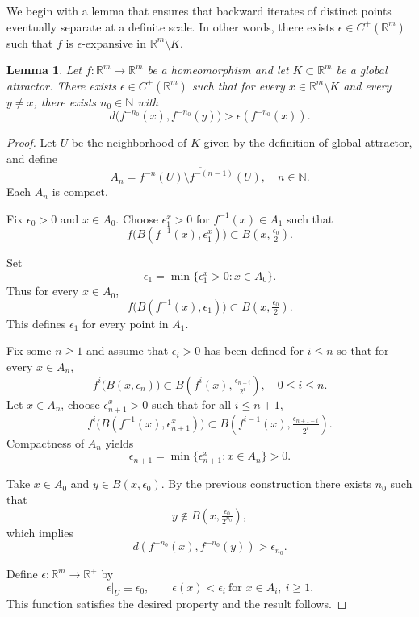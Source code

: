 \documentclass{amsart}
\newtheorem{lemma}{Lemma}
\newcommand{\R}{{\mathbb{R}}}
\newcommand{\N}{{\mathbb{N}}}
\begin{document}
	
	We begin with a lemma that ensures that backward iterates of distinct points eventually separate at a definite scale. In other words, there exists $\epsilon\in C^+(\R^m)$ such that $f$ is $\epsilon$-expansive in $\R^m\setminus K$.
	
	\begin{lemma}\label{epsilon_expansivo_gral}
		Let $f:\R^m\to \R^m$ be a homeomorphism and let $K\subset \R^m$ be a global attractor.  
		There exists $\epsilon\in C^+(\R^m)$ such that for every $x\in \R^m\setminus K$ and every $y\neq x$, there exists $n_0\in \N$ with  
		\[
		d\big(f^{-n_0}(x), f^{-n_0}(y)\big)>\epsilon(f^{-n_0}(x)).
		\]
	\end{lemma}
	
	\begin{proof}
		Let $U$ be the neighborhood of $K$ given by the definition of global attractor, and define  
		\[
		A_n=\overline{f^{-n}(U)\setminus f^{-(n-1)}(U)},\quad n\in\N.
		\]
		Each $A_n$ is compact.
		
		
		  
		Fix $\epsilon_0>0$ and   $x\in A_0$.  
		Choose $\epsilon_1^x>0$ for $f^{-1}(x)\in A_1$ such that  
		\[
		f\big(B(f^{-1}(x), \epsilon_1^x)\big)\subset B(x,\tfrac{\epsilon_0}{2}).
		\] 
		
		Set  
		\[
		\epsilon_1=\min\{\epsilon_1^{x}>0: x\in A_0\}.
		\]  
		Thus for every $x\in A_0$,  
		\[
		f\big(B(f^{-1}(x), \epsilon_1)\big)\subset B(x,\tfrac{\epsilon_0}{2}).
		\]  
		This defines $\epsilon_1$ for every point in $A_1$.		
		
		
		
		
		
		
		
		
		
		
		
	 
		Fix some $n\geq 1$ and assume that $\epsilon_i>0$ has been defined for $i\leq n$ so that for every $x\in A_n$,  
		\[
		f^i\big(B(x,\epsilon_n)\big)\subset B\!\left(f^i(x), \tfrac{\epsilon_{n-i}}{2^i}\right),\quad 0\leq i\leq n.
		\]  
		Let $x\in A_n$,  
		choose $\epsilon_{n+1}^x>0$ such that for all $i\leq n+1$,  
		\[
		f^i\big(B(f^{-1}(x),\epsilon_{n+1}^x)\big)\subset B\!\left(f^{i-1}(x), \tfrac{\epsilon_{n+1-i}}{2^i}\right).
		\]  
		Compactness of $A_n$ yields   
		\[
		\epsilon_{n+1}=\min\{\epsilon_{n+1}^{x}: x\in A_n\}>0.
		\]  
		
		
		
	
		Take $x\in A_0$ and $y\in B(x,\epsilon_0)$.  
		By the previous construction there exists $n_0$ such that  
		\[
		y\notin B\!\left(x,\tfrac{\epsilon_0}{2^{n_0}}\right),
		\]
		which implies  
		\[
		d(f^{-n_0}(x), f^{-n_0}(y))>\epsilon_{n_0}.
		\]
		
		
		
	
		Define $\epsilon:\R^m\to \R^+$ by  
		\[
		\epsilon|_U \equiv \epsilon_0, 
		\qquad \epsilon(x)<\epsilon_i \ \text{for } x\in A_i,\ i\geq 1.
		\]
		This function satisfies the desired property and the result follows.
	\end{proof}
	
\end{document}
